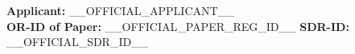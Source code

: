 \begin{tcolorbox}[colback=white, colframe=black, boxrule=0.5pt]

\textbf{Applicant:} __OFFICIAL_APPLICANT__ \hfill  \\
\textbf{OR-ID of Paper:} __OFFICIAL_PAPER_REG_ID__ \hfill \textbf{SDR-ID:} __OFFICIAL_SDR_ID__

\end{tcolorbox}
